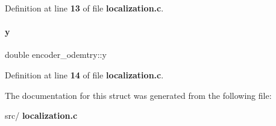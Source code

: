 Definition at line \textbf{ 13} of file \textbf{ localization.\+c}.

\mbox{\label{structencoder__odemtry_a955cbea800158b8c0cd5f36b253fe6bb}} 
\paragraph{y}
{\footnotesize\ttfamily double encoder\+\_\+odemtry\+::y}



Definition at line \textbf{ 14} of file \textbf{ localization.\+c}.



The documentation for this struct was generated from the following file\+:\begin{DoxyCompactItemize}
\item 
src/\textbf{ localization.\+c}\end{DoxyCompactItemize}
